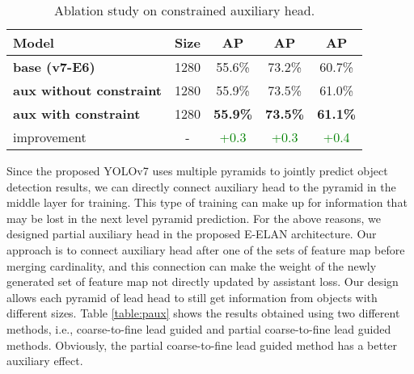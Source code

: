 \documentclass[10pt,twocolumn,letterpaper]{article}
\begin{document}
		\begin{table}[h]
			\centering
			\begin{threeparttable}[h]
				\footnotesize
				\caption{Ablation study on constrained auxiliary head.}
				\label{table:caux}
				\setlength\tabcolsep{5.0pt}
				\begin{tabular}{lcccc}
					\toprule
					\textbf{Model} & \textbf{Size} & \textbf{AP} & \textbf{AP} & \textbf{AP} \\	
					\midrule
					\textbf{base (v7-E6)} & 1280 & 55.6\% & 73.2\% & 60.7\% \\
					\textbf{aux without constraint} & 1280 & 55.9\% & 73.5\% & 61.0\% \\
					\textbf{aux with constraint} & 1280 & \textbf{55.9\%} & \textbf{73.5\%} & \textbf{61.1\%} \\
					improvement & - & \textcolor{green}{+0.3} & \textcolor{green}{+0.3} & \textcolor{green}{+0.4} \\
					\bottomrule
				\end{tabular}
\end{threeparttable}
		\end{table}
	
		Since the proposed YOLOv7 uses multiple pyramids to jointly predict object detection results, we can directly connect auxiliary head to the pyramid in the middle layer for training. This type of training can make up for information that may be lost in the next level pyramid prediction. For the above reasons, we designed partial auxiliary head in the proposed E-ELAN architecture. Our approach is to connect auxiliary head after one of the sets of feature map before merging cardinality, and this connection can make the weight of the newly generated set of feature map not directly updated by assistant loss. Our design allows each pyramid of lead head to still get information from objects with different sizes. Table \ref{table:paux} shows the results obtained using two different methods, i.e., coarse-to-fine lead guided and partial coarse-to-fine lead guided methods. Obviously, the partial coarse-to-fine lead guided method has a better auxiliary effect.
		
		\vspace{-2mm}
		
		
		
\end{document}
